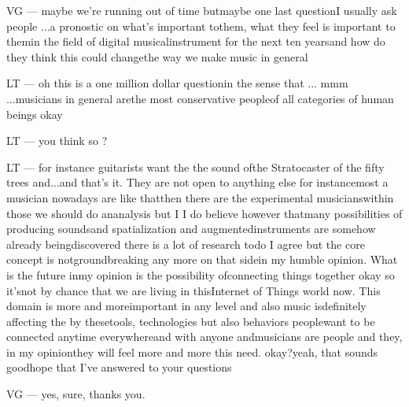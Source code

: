 VG — maybe we're running out of time butmaybe one last questionI usually ask people ...a pronostic on what's important tothem, what they feel is important to themin the field of digital musicalinstrument for the next ten yearsand how do they think this could changethe way we make music in general

LT — oh this is a one million dollar questionin the sense that ... mmm ...musicians in general arethe most conservative peopleof all categories of human beings okay

LT — you think so ?

LT — for instance guitarists want the the sound ofthe Stratocaster of the fifty trees and...and that's it. They are not open to anything else for instancemost a musician nowadays are like thatthen there are the experimental musicianswithin those we should do ananalysis but I I do believe however thatmany possibilities of producing soundsand spatialization and augmentedinstruments are somehow already beingdiscovered there is a lot of research todo I agree but the core concept is notgroundbreaking any more on that sidein my humble opinion. What is the future inmy opinion is the possibility ofconnecting things together okay so it'snot by chance that we are living in thisInternet of Things world now. This domain is more and moreimportant in any level and also music isdefinitely affecting the by thesetools, technologies but also behaviors peoplewant to be connected anytime everywhereand with anyone andmusicians are people and they, in my opinionthey will feel more and more this need. okay?yeah, that sounds goodhope that I've answered to your questions

VG — yes, sure, thanks you.